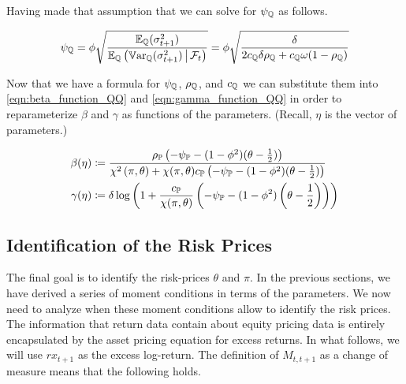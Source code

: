 \documentclass[11pt, letterpaper, twoside, final]{article}
\begin{document}

Having made that assumption that we can solve for $\psi_{\mathbb{Q}}$ as follows.

\begin{equation}
    \psi_{\mathbb{Q}} =  \phi \sqrt{\frac{\operatorname{\mathbb{E}}_{\mathbb{Q}}(\sigma^2_{t+1})}{\operatorname{\mathbb{E}}_{\mathbb{Q}}\left(\operatorname{\mathbb{V}ar}_{\mathbb{Q}}(\sigma^2_{t+1}) \,\middle\vert\, \mathcal{F}_t
    \right)}}
    = \phi \sqrt{\frac{\delta}{2 c_{\mathbb{Q}} \delta \rho_{\mathbb{Q}} + c_{\mathbb{Q}} \omega (1 - \rho_{\mathbb{Q}})}}
    \label{eqn:psi_function}
\end{equation}

Now that we have a formula for $\psi_{\mathbb{Q}}$, $\rho_{\mathbb{Q}}$, and $c_{\mathbb{Q}}$ we can substitute them into
\cref{eqn:beta_function_QQ}  and \cref{eqn:gamma_function_QQ} in order to reparameterize $\beta$ and $\gamma$ as
functions of the parameters.
(Recall, $\eta$ is the vector of parameters.)

\begin{align}
    \label{eqn:beta_function}
    \beta(\eta) &\coloneqq \frac{\rho_{\PP} \left(-\psi_{\PP} - (1- \phi^2)(\theta -
    \frac{1}{2})\right)}{\chi^2\left(\pi, \theta\right) + \chi(\pi, \theta)c_{\PP} \left(-\psi_{\PP} - (1-
    \phi^2)(\theta-\frac{1}{2} )\right)}  \\
%
    \label{eqn:gamma_function}
    \gamma(\eta) &\coloneqq \delta \log\left(1 + \frac{c_{\PP}}{\chi(\pi,\theta)} \left(-\psi_{\PP} - (1-
    \phi^2)\left(\theta - \frac{1}{2}\right) \right)\right)
\end{align}

\subsection{Identification of the Risk Prices}

The final goal is to identify the risk-prices $\theta$ and $\pi$.
In the previous sections, we have derived a series of moment conditions in terms of the parameters.
We now need to analyze when these moment conditions allow to identify the risk prices. 
The information that return data contain about equity pricing data is entirely encapsulated by the asset pricing
equation for excess returns.  
In what follows, we will use $rx_{t+1}$ as the excess log-return.
The definition of $M_{t,t+1}$ as a change of measure means that the following holds.
\end{document}
